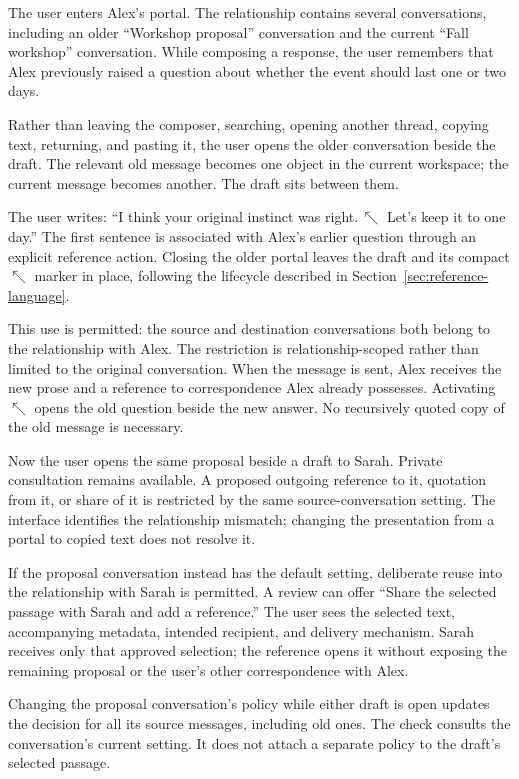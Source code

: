 \documentclass[11pt]{article}
\DeclareRobustCommand{\refmark}{\ensuremath{\nwarrow}}
\begin{document}
The user enters Alex's portal. The relationship contains several conversations, including an older ``Workshop proposal'' conversation and the current ``Fall workshop'' conversation. While composing a response, the user remembers that Alex previously raised a question about whether the event should last one or two days.

Rather than leaving the composer, searching, opening another thread, copying text, returning, and pasting it, the user opens the older conversation beside the draft. The relevant old message becomes one object in the current workspace; the current message becomes another. The draft sits between them.

The user writes: ``I think your original instinct was right.\,\refmark{} Let's keep it to one day.'' The first sentence is associated with Alex's earlier question through an explicit reference action. Closing the older portal leaves the draft and its compact \refmark{} marker in place, following the lifecycle described in Section~\ref{sec:reference-language}.

This use is permitted: the source and destination conversations both belong to the relationship with Alex. The restriction is relationship-scoped rather than limited to the original conversation. When the message is sent, Alex receives the new prose and a reference to correspondence Alex already possesses. Activating \refmark{} opens the old question beside the new answer. No recursively quoted copy of the old message is necessary.

Now the user opens the same proposal beside a draft to Sarah. Private consultation remains available. A proposed outgoing reference to it, quotation from it, or share of it is restricted by the same source-conversation setting. The interface identifies the relationship mismatch; changing the presentation from a portal to copied text does not resolve it.

If the proposal conversation instead has the default setting, deliberate reuse into the relationship with Sarah is permitted. A review can offer ``Share the selected passage with Sarah and add a reference.'' The user sees the selected text, accompanying metadata, intended recipient, and delivery mechanism. Sarah receives only that approved selection; the reference opens it without exposing the remaining proposal or the user's other correspondence with Alex.

Changing the proposal conversation's policy while either draft is open updates the decision for all its source messages, including old ones. The check consults the conversation's current setting. It does not attach a separate policy to the draft's selected passage.
\end{document}

